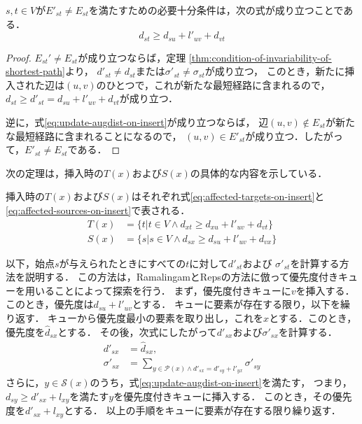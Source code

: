\begin{lemma}
  \label{lmm:update-augdist-on-insert}
  $s,t\in V$が$E'_{st}\neq E_{st}$を満たすための必要十分条件は，次の式が成り立つことである．
  \begin{equation}
    d_{st}\geq d_{su}+l'_{uv}+d_{vt}
    \label{eq:update-augdist-on-insert}
  \end{equation}
\end{lemma}
\begin{proof}
  $E_{st}'\neq E_{st}$が成り立つならば，定理
  \ref{thm:condition-of-invariability-of-shortest-path}より，
  $d'_{st}\neq d_{st}$または$\sigma'_{st}\neq\sigma_{st}$が成り立つ，
  このとき，新たに挿入された辺は$(u,v)$のひとつで，これが新たな最短経路に含まれるので，
  $d_{st}\geq d'_{st}=d_{su}+l'_{uv}+d_{vt}$が成り立つ．

  逆に，式\eqref{eq:update-augdist-on-insert}が成り立つならば，
  辺$(u,v)\notin E_{st}$が新たな最短経路に含まれることになるので，
  $(u,v)\in E'_{st}$が成り立つ．したがって，$E'_{st}\neq E_{st}$である．
\end{proof}

次の定理は，挿入時の$T(x)$および$S(x)$の具体的な内容を示している．
\begin{theorem}
  \label{thm:affected-vertices-on-insert}
  挿入時の$T(x)$および$S(x)$はそれぞれ式\eqref{eq:affected-targets-on-insert}と
  \eqref{eq:affected-sources-on-insert}で表される．
  \begin{align}
    T(x)&=\{t|t\in V\land d_{xt}\geq d_{xu}+l'_{uv}+d_{vt}\}
    \label{eq:affected-targets-on-insert} \\
    S(x)&=\{s|s\in V\land d_{sx}\geq d_{su}+l'_{uv}+d_{vx}\}
    \label{eq:affected-sources-on-insert}
  \end{align}
\end{theorem}

以下，始点$s$が与えられたときにすべての$t$に対して$d'_{st}$および
$\sigma'_{st}$を計算する方法を説明する．
この方法は，RamalingamとRepsの方法に倣って優先度付きキューを用いることによって探索を行う．
まず，優先度付きキューに$v$を挿入する．このとき，優先度は$d_{su}+l'_{uv}$とする．
キューに要素が存在する限り，以下を繰り返す．
キューから優先度最小の要素を取り出し，これを$x$とする．このとき，
優先度を$\hat{d}_{sx}$とする．
その後，次式にしたがって$d'_{sx}$および$\sigma'_{sx}$を計算する．
\begin{equation*}
  \begin{aligned}
    d'_{sx}&=\hat{d}_{sx},\\
    \sigma'_{sx}&=\sum_{y\in\mathcal{P}(x)\land d'_{sx}=d'_{sy}+l'_{yx}}\sigma'_{sy}
  \end{aligned}
\end{equation*}
さらに，$y\in\mathcal{S}(x)$のうち，式\eqref{eq:update-augdist-on-insert}を満たす，
つまり，$d_{sy}\geq d'_{sx}+l_{xy}$を満たす$y$を優先度付きキューに挿入する．
このとき，その優先度を$d'_{sx}+l_{xy}$とする．
以上の手順をキューに要素が存在する限り繰り返す．


